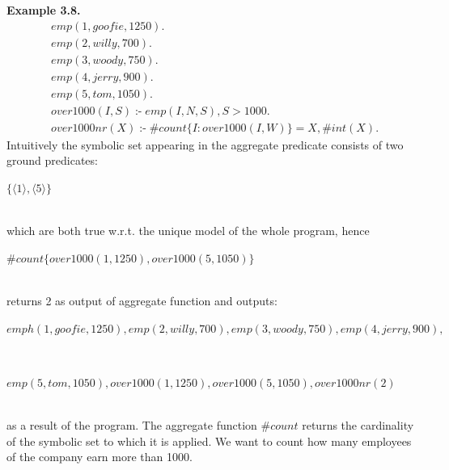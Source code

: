 \documentclass[14pt,a4paper, titlepage]{article}
\DeclareMathOperator{\leftimpl}{:-}
\begin{document}
\textbf{Example 3.8.}
\begin{align*}
& emp(1,goofie,1250).\\
& emp(2,willy,700).\\
& emp(3,woody,750).\\
& emp(4,jerry,900).\\
& emp(5,tom,1050). \\
& over1000(I,S) \leftimpl emp(I,N,S), S > 1000.\\
& over1000nr(X) \leftimpl \#count\{I : over1000(I,W)\} = X, \#int(X).
\end{align*}
Intuitively the symbolic set appearing in the aggregate predicate consists of two ground predicates: \\ \centerline{$\{\langle 1 \rangle,\langle 5 \rangle\}$}
\\which are both true w.r.t. the unique model of the whole program, hence \\ \centerline{$ \#count\{over1000(1,1250),over1000(5,1050)\}$} \\returns 2 as output of aggregate function and outputs:\\ \centerline{ $\mathit{emph(1,goofie,1250),emp(2,willy,700),emp(3,woody,750),emp(4,jerry,900),}$}
\\ \centerline{ $\mathit{emp(5,tom,1050),over1000(1,1250),over1000(5,1050),over1000nr(2)}$}
\\as a result of the program.
The aggregate function $\mathit{\#count}$ returns the cardinality of the symbolic set to which it is applied. We want to count how many employees of the company earn more than 1000. 
\end{document}
